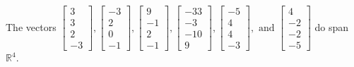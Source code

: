 \begin{exercise}
\begin{exerciseStatement}
  \end{exerciseStatement}
  \begin{exerciseAnswer}
   The vectors \(\left[\begin{array}{r}
3 \\
3 \\
2 \\
-3
\end{array}\right] , \left[\begin{array}{r}
-3 \\
2 \\
0 \\
-1
\end{array}\right] , \left[\begin{array}{r}
9 \\
-1 \\
2 \\
-1
\end{array}\right] , \left[\begin{array}{r}
-33 \\
-3 \\
-10 \\
9
\end{array}\right] , \left[\begin{array}{r}
-5 \\
4 \\
4 \\
-3
\end{array}\right] , \text{ and } \left[\begin{array}{r}
4 \\
-2 \\
-2 \\
-5
\end{array}\right]\) 
  	 do  
	span \(\mathbb{R}^4\).
  


  \end{exerciseAnswer}
\end{exercise}